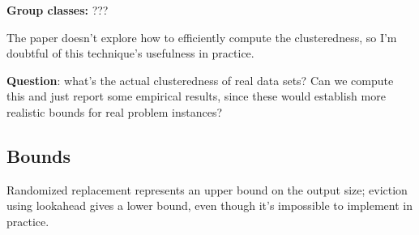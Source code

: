 \documentclass[12pt]{article}
\begin{document}
\textbf{Group classes:} ???

The paper doesn't explore how to efficiently compute the clusteredness, so I'm doubtful of this technique's usefulness in practice.

\textbf{Question}: what's the actual clusteredness of real data sets?  Can we compute this and just report some empirical results, since these would establish more realistic bounds for real problem instances?

\subsection{Bounds}

\cite{estimating-cardinality}
Randomized replacement represents an upper bound on the output size; eviction using lookahead gives a lower bound, even though it's impossible to implement in practice.




\end{document}
